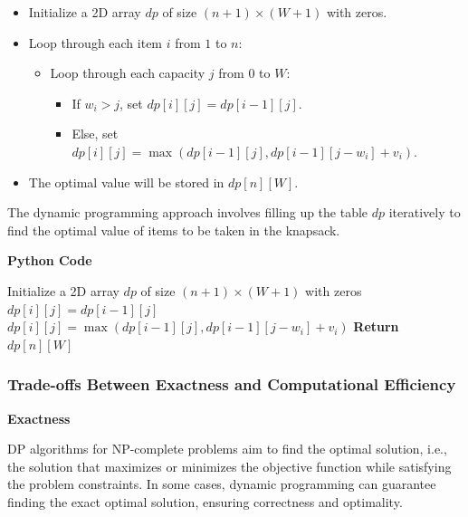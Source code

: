 \documentclass[12pt]{book} %
\begin{document}
\begin{itemize}
    \item Initialize a 2D array $dp$ of size $(n+1) \times (W+1)$ with zeros.
    \item Loop through each item $i$ from $1$ to $n$:
    \begin{itemize}
        \item Loop through each capacity $j$ from $0$ to $W$:
        \begin{itemize}
            \item If $w_i > j$, set $dp[i][j] = dp[i-1][j]$.
            \item Else, set $dp[i][j] = \max(dp[i-1][j], dp[i-1][j-w_i] + v_i)$.
        \end{itemize}
    \end{itemize}
     \item The optimal value will be stored in $dp[n][W]$.
\end{itemize}


The dynamic programming approach involves filling up the table $dp$ iteratively to find the optimal value of items to be taken in the knapsack.

\textbf{Python Code}
\FloatBarrier
\begin{algorithm}
\caption{Dynamic Programming for Knapsack Problem}
\begin{algorithmic}[1]
\State Initialize a 2D array $dp$ of size $(n+1) \times (W+1)$ with zeros
            \State $dp[i][j] = dp[i-1][j]$
        \Else
            \State $dp[i][j] = \max(dp[i-1][j], dp[i-1][j-w_i] + v_i)$
        \EndIf
    \EndFor
\EndFor
\State \textbf{Return} $dp[n][W]$
\end{algorithmic}
\end{algorithm}
\FloatBarrier

\subsubsection{Trade-offs Between Exactness and Computational Efficiency}

\textbf{Exactness}

DP algorithms for NP-complete problems aim to find the optimal solution, i.e., the solution that maximizes or minimizes the objective function while satisfying the problem constraints. In some cases, dynamic programming can guarantee finding the exact optimal solution, ensuring correctness and optimality.
\end{document}
